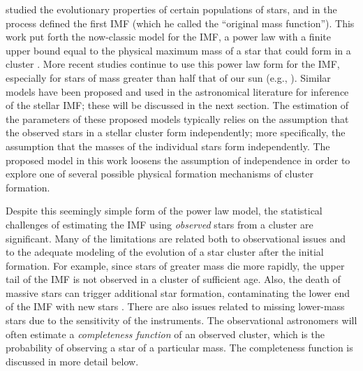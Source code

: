 \documentclass[ejs]{imsart}
\numberwithin{equation}{section}
\theoremstyle{plain}
\begin{document}
\cite{salpeter55} studied the evolutionary properties of certain 
populations of stars, and in the process defined the first IMF 
(which he called the ``original mass function'').  
This work put forth the now-classic model for the IMF, a power law 
with a finite upper bound equal to the physical maximum mass of a star that 
could form in a cluster \citep{salpeter55}.  
More recent studies continue to use this power law form for the IMF, especially for stars of mass greater than half that
of our sun (e.g., \citealt{Massey2003, bastian2010, DaRioEtAl2012, Lim2013, weisz13, Weisz:2015kx, Jose2017}).
Similar models have been proposed and used in the astronomical literature for inference of the 
stellar IMF; these will be discussed in the next section. 
The estimation of the parameters of these proposed models typically relies on the assumption that 
the observed stars in a stellar cluster form independently; more specifically, the assumption that the masses of the individual stars form independently. 
The proposed model in this work loosens the assumption of independence in order to explore one of several possible physical formation 
mechanisms of cluster formation.

Despite this seemingly simple form of the power law model, the statistical challenges of estimating the 
IMF using \emph{observed} stars from a cluster are significant. Many of the limitations are related 
both to 
observational issues and to the adequate modeling of the evolution of a star cluster after the 
initial formation. For example, since stars of greater mass die more rapidly, the upper tail of the IMF is 
not observed in a cluster of sufficient age.  
Also, the death of massive stars can trigger additional star formation,
contaminating the lower end of the IMF with new stars \citep{Woosley2015}.
There are also issues related to missing lower-mass stars due to the sensitivity of the instruments.  
The observational astronomers will often estimate a \emph{completeness function} of an observed 
cluster, which is the probability of observing a star of a particular mass.  The completeness 
function is discussed in more detail below.
\end{document}
